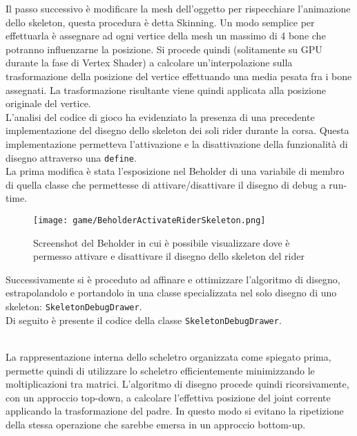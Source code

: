 	Il passo successivo è modificare la mesh dell'oggetto per rispecchiare l'animazione dello skeleton, questa procedura è detta Skinning. Un modo semplice per effettuarla è assegnare ad ogni vertice della mesh un massimo di 4 bone che potranno influenzarne la posizione. Si procede quindi (solitamente su GPU durante la fase di Vertex Shader) a calcolare un'interpolazione sulla trasformazione della posizione del vertice effettuando una media pesata fra i bone assegnati. La trasformazione risultante viene quindi applicata alla posizione originale del vertice.\\
	
	L'analisi del codice di gioco ha evidenziato la presenza di una precedente implementazione del disegno dello skeleton dei soli rider durante la corsa. Questa implementazione permetteva l'attivazione e la disattivazione della funzionalità di disegno attraverso una \texttt{define}.\\

	La prima modifica è stata l'esposizione nel Beholder di una variabile di membro di quella classe che permettesse di attivare/disattivare il disegno di debug a run-time.\\
	
	\begin{figure}[h!] 
		\centering 
		\hspace*{-0.05\columnwidth}\texttt{[image: game/BeholderActivateRiderSkeleton.png]} 
		\caption{Screenshot del Beholder in cui è possibile visualizzare dove è permesso attivare e disattivare il disegno dello skeleton del rider}
	\end{figure}
	
	Successivamente si è proceduto ad affinare e ottimizzare l'algoritmo di disegno, estrapolandolo e portandolo in una classe specializzata nel solo disegno di uno skeleton: \texttt{SkeletonDebugDrawer}.\\
	
	Di seguito è presente il codice della classe \texttt{SkeletonDebugDrawer}.
	
	
	
	
	~\\
	La rappresentazione interna dello scheletro organizzata come spiegato prima, permette quindi di utilizzare lo scheletro efficientemente minimizzando le moltiplicazioni tra matrici. L'algoritmo di disegno procede quindi ricorsivamente, con un approccio top-down, a calcolare l'effettiva posizione del joint corrente applicando la trasformazione del padre. In questo modo si evitano la ripetizione della stessa operazione che sarebbe emersa in un approccio bottom-up.
	
